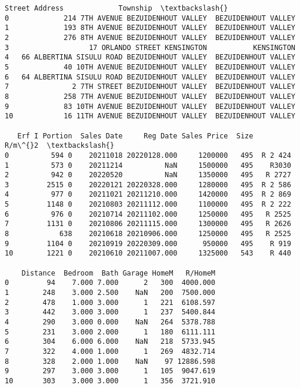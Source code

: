             \begin{tcolorbox}[breakable, size=fbox, boxrule=.5pt, pad at break*=1mm, opacityfill=0]
\begin{Verbatim}[commandchars=\\\{\}]
                                  Street Address             Township  \textbackslash{}
0             214 7TH AVENUE BEZUIDENHOUT VALLEY  BEZUIDENHOUT VALLEY
1             193 8TH AVENUE BEZUIDENHOUT VALLEY  BEZUIDENHOUT VALLEY
2             276 8TH AVENUE BEZUIDENHOUT VALLEY  BEZUIDENHOUT VALLEY
3                   17 ORLANDO STREET KENSINGTON           KENSINGTON
4   66 ALBERTINA SISULU ROAD BEZUIDENHOUT VALLEY  BEZUIDENHOUT VALLEY
5             40 10TH AVENUE BEZUIDENHOUT VALLEY  BEZUIDENHOUT VALLEY
6   64 ALBERTINA SISULU ROAD BEZUIDENHOUT VALLEY  BEZUIDENHOUT VALLEY
7               2 7TH STREET BEZUIDENHOUT VALLEY  BEZUIDENHOUT VALLEY
8             258 7TH AVENUE BEZUIDENHOUT VALLEY  BEZUIDENHOUT VALLEY
9             83 10TH AVENUE BEZUIDENHOUT VALLEY  BEZUIDENHOUT VALLEY
10            16 11TH AVENUE BEZUIDENHOUT VALLEY  BEZUIDENHOUT VALLEY

   Erf I Portion  Sales Date     Reg Date Sales Price  Size    R/m\^{}2  \textbackslash{}
0          594 0    20211018 20220128.000     1200000   495  R 2 424
1          573 0    20211214          NaN     1500000   495    R3030
2          942 0    20220520          NaN     1350000   495   R 2727
3         2515 0    20220121 20220328.000     1280000   495  R 2 586
4          977 0    20211021 20211210.000     1420000   495  R 2 869
5         1148 0    20210803 20211112.000     1100000   495  R 2 222
6          976 0    20210714 20211102.000     1250000   495   R 2525
7         1131 0    20210806 20211115.000     1300000   495   R 2626
8            638    20210618 20210906.000     1250000   495   R 2525
9         1104 0    20210919 20220309.000      950000   495    R 919
10        1221 0    20210610 20211007.000     1325000   543    R 440

    Distance  Bedroom  Bath Garage HomeM   R/HomeM
0         94    7.000 7.000      2   300  4000.000
1        248    3.000 2.500    NaN   200  7500.000
2        478    1.000 3.000      1   221  6108.597
3        442    3.000 3.000      1   237  5400.844
4        290    3.000 0.000    NaN   264  5378.788
5        231    3.000 2.000      1   180  6111.111
6        304    6.000 6.000    NaN   218  5733.945
7        322    4.000 1.000      1   269  4832.714
8        328    2.000 1.000    NaN    97 12886.598
9        297    3.000 3.000      1   105  9047.619
10       303    3.000 3.000      1   356  3721.910
\end{Verbatim}
\end{tcolorbox}
        
